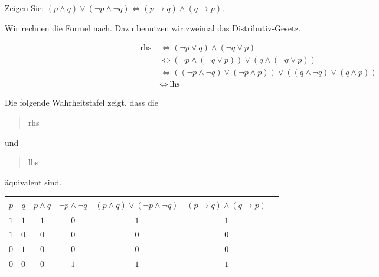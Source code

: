 
\begin{exercise}[19]

Zeigen Sie:
$(p \land q) \lor (\neg p \land \neg q) \Leftrightarrow (p \to q) \land (q \to p)$.

\end{exercise}


\begin{solution}

Wir rechnen die Formel nach.
Dazu benutzen wir zweimal das Distributiv-Gesetz.

\begin{align*}
    \text{rhs}~
    & \iff
    (\neg p \lor q) \land (\neg q \lor p) \\
    & \iff
    (\neg p \land (\neg q \lor p)) \lor (q \land (\neg q \lor p)) \\
    & \iff
    ((\neg p \land \neg q) \lor (\neg p \land p)) \lor ((q \land \neg q) \lor (q \land p)) \\
    & \iff
    ~\text{lhs}
\end{align*}

\end{solution}


\begin{solution}

Die folgende Wahrheitstafel zeigt, dass die \blockquote{rhs} und \blockquote{lhs} äquivalent sind. \\

\begin{tabular}{|c|c|c|c|c|c|c|}
    \hline
    $p$ & $q$ & $p \land q$ & $\neg p \land \neg q$ & $(p \land q) \lor (\neg p \land \neg q)$ & $(p \to q) \land (q \to p)$ \\
    \hline
    $1$ & $1$ & $1$ & $0$ & $1$ & $1$ \\
    \hline
    $1$ & $0$ & $0$ & $0$ & $0$ & $0$ \\
    \hline
    $0$ & $1$ & $0$ & $0$ & $0$ & $0$ \\
    \hline
    $0$ & $0$ & $0$ & $1$ & $1$ & $1$ \\
    \hline
\end{tabular}

\end{solution}

